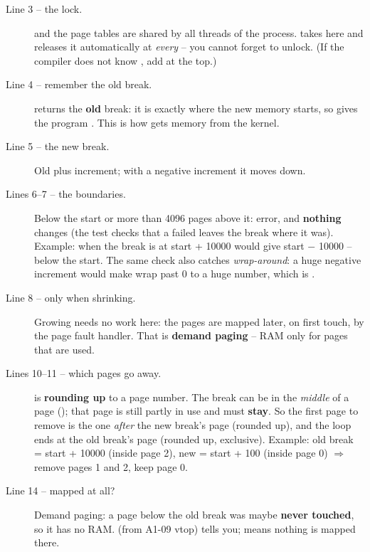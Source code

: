\documentclass[11pt]{report}
\begin{document}
\begin{description}
  \item[Line 3 -- the lock.]  and the page tables are shared by all threads of the process.
         takes  here and releases it automatically at \emph{every}
         -- you cannot forget to unlock. (If the compiler does not know , add
         at the top.)
  \item[Line 4 -- remember the old break.]  returns the \textbf{old} break: it is exactly where
        the new memory starts, so  gives the program . This is
        how  gets memory from the kernel.
  \item[Line 5 -- the new break.] Old plus increment; with a negative increment it moves down.
  \item[Lines 6--7 -- the boundaries.] Below the start or more than 4096 pages above it: error, and
        \textbf{nothing} changes (the test checks that a failed  leaves the break where it was).
        Example:  when the break is at start + 10000 would give start $-$ 10000 --
        below the start. The same check also catches \emph{wrap-around}: a huge negative increment
        would make  wrap past 0 to a huge number, which is .
  \item[Line 8 -- only when shrinking.] Growing needs no work here: the pages are mapped later, on first
        touch, by the page fault handler. That is \textbf{demand paging} -- RAM only for pages that are used.
  \item[Lines 10--11 -- which pages go away.]  is \textbf{rounding
        up} to a page number. The break can be in the \emph{middle} of a page (); that page
        is still partly in use and must \textbf{stay}. So the first page to remove is the one \emph{after}
        the new break's page (rounded up), and the loop ends at the old break's page (rounded up, exclusive).
        Example: old break = start + 10000 (inside page 2), new = start + 100 (inside page 0)
        $\Rightarrow$ remove pages 1 and 2, keep page 0.
  \item[Line 14 -- mapped at all?] Demand paging: a page below the old break was maybe \textbf{never
        touched}, so it has no RAM.  (from A1-09 vtop) tells you; 
        means nothing is mapped there.

\end{description}
\end{document}
